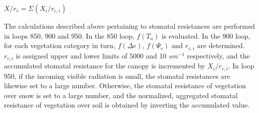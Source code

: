 $X/r_c = \Sigma (X_i / r_{c,i})$

The calculations described above pertaining to stomatal resistances are performed in loops 850, 900 and 950. In the 850 loop, $f(T_a)$ is evaluated. In the 900 loop, for each vegetation category in turn, $f(\Delta e)$, $f(\Psi_s)$ and $r_{c,i}$ are determined. $r_{c,i}$ is assigned upper and lower limits of 5000 and 10 $s m^{-1}$ respectively, and the accumulated stomatal resistance for the canopy is incremented by $X_i / r_{c,i}$. In loop 950, if the incoming visible radiation is small, the stomatal resistances are likewise set to a large number. Otherwise, the stomatal resistance of vegetation over snow is set to a large number, and the normalized, aggregated stomatal resistance of vegetation over soil is obtained by inverting the accumulated value.